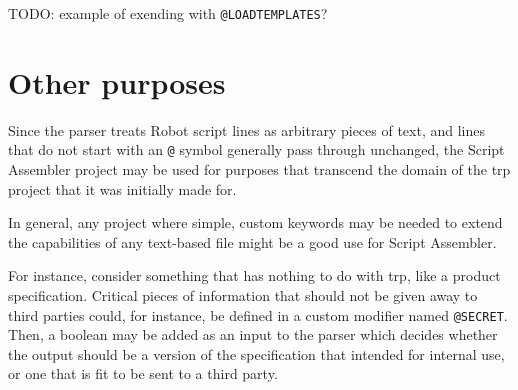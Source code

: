 TODO: example of exending with \verb|@LOADTEMPLATES|?

\section{Other purposes}

Since the parser treats Robot script lines as arbitrary pieces of text, and lines that do not start with an \verb|@| symbol generally pass through unchanged, the Script Assembler project may be used for purposes that transcend the domain of the \gls{trp} project that it was initially made for. 

In general, any project where simple, custom keywords may be needed to extend the capabilities of any text-based file might be a good use for Script Assembler. 

For instance, consider something that has nothing to do with \gls{trp}, like a product specification. Critical pieces of information that should not be given away to third parties could, for instance, be defined in a custom modifier named \verb|@SECRET|. Then, a boolean may be added as an input to the parser which decides whether the output should be a version of the specification that intended for internal use, or one that is fit to be sent to a third party. 
